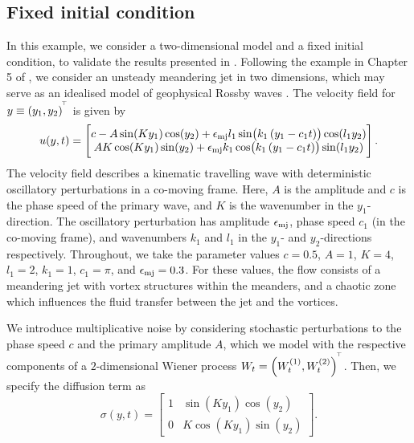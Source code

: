 \subsection{Fixed initial condition}\label{sec:numerics_2d}
In this example, we consider a two-dimensional model and a fixed initial condition, to validate the results presented in .
Following the example in Chapter 5 of \citet{SamelsonWiggins_2006_LagrangianTransportGeophysical}, we consider an unsteady meandering jet in two dimensions, which may serve as an idealised model of geophysical Rossby waves \citep{Pierrehumbert_1991_ChaoticMixingTracer}.
The velocity field for \(y \equiv \left(y_1, y_2\right)^{^{\!\top}}\) is given by
\begin{equation}
	u\!\left(y, t\right) = \begin{bmatrix}
		c - A\sin\!\left(Ky_1\right)\cos\!\left(y_2\right) + \oldepsilon_{\mathrm{mj}} l_1\sin\!\left(k_1\left(y_1 - c_1 t\right)\right)\cos\!\left(l_1 y_2\right) \\
		AK\cos\!\left(Ky_1\right)\sin\!\left(y_2\right) + \oldepsilon_{\mathrm{mj}} k_1\cos\!\left(k_1\left(y_1 - c_1t\right)\right)\sin\!\left(l_1 y_2\right)
	\end{bmatrix}.
	\label{eqn:jet_ex}
\end{equation}
The velocity field describes a kinematic travelling wave with deterministic oscillatory perturbations in a co-moving frame.
Here, \(A\) is the amplitude and \(c\) is the phase speed of the primary wave, and \(K\) is the wavenumber in the \(y_1\)-direction.
The oscillatory perturbation has amplitude \(\epsilon_{\mathrm{mj}}\), phase speed \(c_1\) (in the co-moving frame), and wavenumbers \(k_1\) and \(l_1\) in the \(y_1\)- and \(y_2\)-directions respectively.
Throughout, we take the parameter values \(c = 0.5\), \(A = 1\), \(K = 4\), \(l_1 = 2\), \(k_1 = 1\), \(c_1 = \pi\), and \(\epsilon_{\mathrm{mj}} = 0.3\).
For these values, the flow consists of a meandering jet with vortex structures within the meanders, and a chaotic zone which influences the fluid transfer between the jet and the vortices.

We introduce multiplicative noise by considering stochastic perturbations to the phase speed \(c\) and the primary amplitude \(A\), which we model with the respective components of a \(2\)-dimensional Wiener process \(W_t = \left(W_t^{(1)}, W_t^{(2)}\right)^{^{\!\top}}\).
Then, we specify the diffusion term as
\begin{equation}
	\sigma\!\left(y,t\right) = \begin{bmatrix}
		1 & \sin\!\left(Ky_1\right)\cos\!\left(y_2\right)  \\
		0 & K\cos\!\left(Ky_1\right)\sin\!\left(y_2\right)
	\end{bmatrix}.
	\label{eqn:jet_ex_sigma}
\end{equation}


